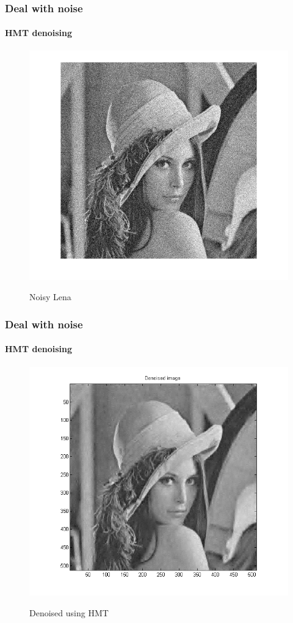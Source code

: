 \documentclass[12pt]{beamer}
\begin{document}
\begin{frame}
  \frametitle{Deal with noise}
  \framesubtitle{HMT denoising}
  
  \begin{figure}[H]
  \centering
  \includegraphics[scale=0.35]{../figs/lena_noisy}
  \label{fig:lena_noisy}
  \caption{Noisy Lena}
  \end{figure} 
\end{frame}

\begin{frame}
  \frametitle{Deal with noise}
  \framesubtitle{HMT denoising}
  
  \begin{figure}[H]
  \centering
  \includegraphics[scale=0.35]{../figs/lena_denoised_hmt}
  \label{fig:lena_denoised_hmt}
  \caption{Denoised using HMT}
  \end{figure} 
\end{frame}
\end{document}
